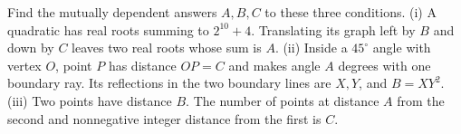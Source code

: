 Find the mutually dependent answers $A,B,C$ to these three conditions. (i) A quadratic has real roots summing to $2^{10}+4$. Translating its graph left by $B$ and down by $C$ leaves two real roots whose sum is $A$. (ii) Inside a $45^\circ$ angle with vertex $O$, point $P$ has distance $OP=C$ and makes angle $A$ degrees with one boundary ray. Its reflections in the two boundary lines are $X,Y$, and $B=XY^2$. (iii) Two points have distance $B$. The number of points at distance $A$ from the second and nonnegative integer distance from the first is $C$.
